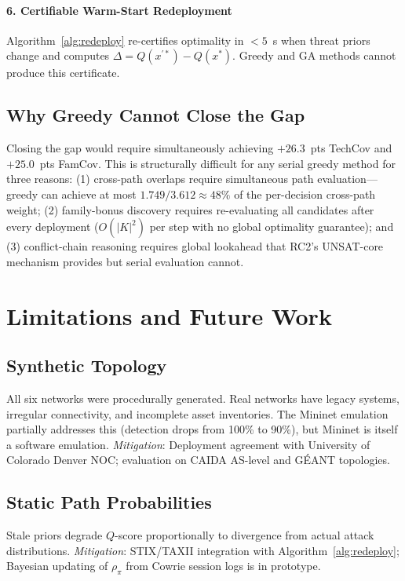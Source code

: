 \documentclass[journal]{IEEEtran}
\newcommand{\qscore}{$Q$-score}
\begin{document}
\paragraph{6. Certifiable Warm-Start Redeployment}
Algorithm~\ref{alg:redeploy} re-certifies optimality in $<5$~s when
threat priors change and computes $\Delta=Q(x^{\prime*})-Q(x^*)$.
Greedy and GA methods cannot produce this certificate.

\subsection{Why Greedy Cannot Close the Gap}
Closing the gap would require simultaneously achieving $+26.3$~pts
TechCov and $+25.0$~pts FamCov. This is structurally difficult for
any serial greedy method for three reasons: (1) cross-path overlaps
require simultaneous path evaluation---greedy can achieve at most
$1.749/3.612\approx48\%$ of the per-decision cross-path weight; (2)
family-bonus discovery requires re-evaluating all candidates after
every deployment ($O(|K|^2)$ per step with no global optimality
guarantee); and (3) conflict-chain reasoning requires global lookahead
that RC2's UNSAT-core mechanism provides but serial evaluation cannot.

\FloatBarrier

\section{Limitations and Future Work}
\label{sec:limitations}

\subsection{Synthetic Topology}
\label{sec:limitations:topology}
All six networks were procedurally generated. Real networks have legacy
systems, irregular connectivity, and incomplete asset inventories.
The Mininet emulation partially addresses this (detection drops from
100\% to 90\%), but Mininet is itself a software emulation.
\textit{Mitigation}: Deployment agreement with University of Colorado
Denver NOC; evaluation on CAIDA AS-level and G\'EANT topologies.

\subsection{Static Path Probabilities}
Stale priors degrade \qscore{} proportionally to divergence from actual
attack distributions. \textit{Mitigation}: STIX/TAXII integration with
Algorithm~\ref{alg:redeploy}; Bayesian updating of $\rho_\pi$ from
Cowrie session logs is in prototype.
\end{document}
